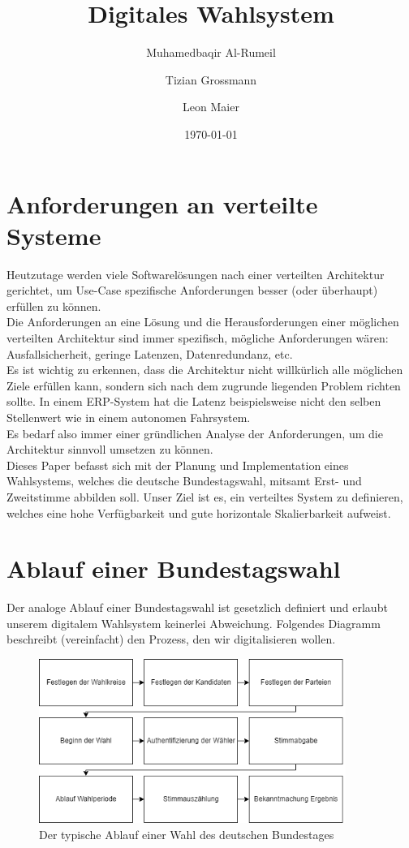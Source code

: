 \documentclass{article}  %
\title{Digitales Wahlsystem}
\author{
    Muhamedbaqir Al-Rumeil \and 
    Tizian Grossmann \and 
    Leon Maier
    }
\date{\today}  %
\begin{document}
\maketitle
\newpage

\tableofcontents
\newpage

\section{Anforderungen an verteilte Systeme}

Heutzutage werden viele Softwarelösungen nach einer verteilten Architektur gerichtet, um Use-Case spezifische Anforderungen besser (oder überhaupt) erfüllen zu können. \\
Die Anforderungen an eine Lösung und die Herausforderungen einer möglichen verteilten Architektur sind immer spezifisch, mögliche Anforderungen wären: Ausfallsicherheit, geringe Latenzen, Datenredundanz, etc.  \\

Es ist wichtig zu erkennen, dass die Architektur nicht willkürlich alle möglichen Ziele erfüllen kann, sondern sich nach dem zugrunde liegenden Problem richten sollte. In einem ERP-System hat die Latenz beispielsweise nicht den selben Stellenwert wie in einem autonomen Fahrsystem. \\
Es bedarf also immer einer gründlichen Analyse der Anforderungen, um die Architektur sinnvoll umsetzen zu können. \\


Dieses Paper befasst sich mit der Planung und Implementation eines Wahlsystems, welches die deutsche Bundestagswahl, mitsamt Erst- und Zweitstimme abbilden soll. Unser Ziel ist es, ein verteiltes System zu definieren, welches eine hohe Verfügbarkeit und gute horizontale Skalierbarkeit aufweist.
  
\newpage

\section{Ablauf einer Bundestagswahl}
Der analoge Ablauf einer Bundestagswahl ist gesetzlich definiert und erlaubt unserem digitalem Wahlsystem keinerlei Abweichung. Folgendes Diagramm beschreibt (vereinfacht) den Prozess, den wir digitalisieren wollen. \\

\begin{figure}[h]
    \centering
    \includegraphics[width=10cm]{Wahlablauf.png}
    \caption{Der typische Ablauf einer Wahl des deutschen Bundestages}
\end{figure} 
\end{document}
